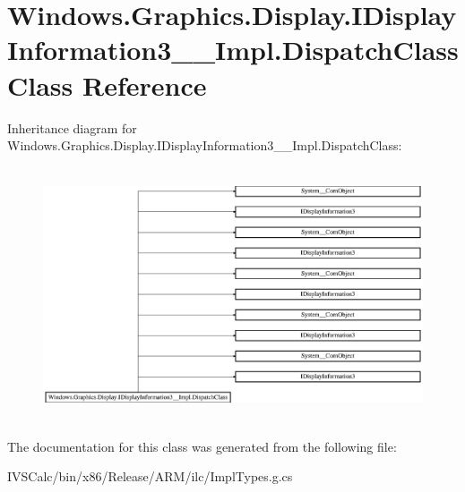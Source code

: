 \hypertarget{class_windows_1_1_graphics_1_1_display_1_1_i_display_information3_____impl_1_1_dispatch_class}{}\section{Windows.\+Graphics.\+Display.\+I\+Display\+Information3\+\_\+\+\_\+\+Impl.\+Dispatch\+Class Class Reference}
\label{class_windows_1_1_graphics_1_1_display_1_1_i_display_information3_____impl_1_1_dispatch_class}
Inheritance diagram for Windows.\+Graphics.\+Display.\+I\+Display\+Information3\+\_\+\+\_\+\+Impl.\+Dispatch\+Class\+:\begin{figure}[H]
\begin{center}
\leavevmode
\includegraphics[height=7.530562cm]{class_windows_1_1_graphics_1_1_display_1_1_i_display_information3_____impl_1_1_dispatch_class}
\end{center}
\end{figure}


The documentation for this class was generated from the following file\+:\begin{DoxyCompactItemize}
\item 
I\+V\+S\+Calc/bin/x86/\+Release/\+A\+R\+M/ilc/Impl\+Types.\+g.\+cs\end{DoxyCompactItemize}
